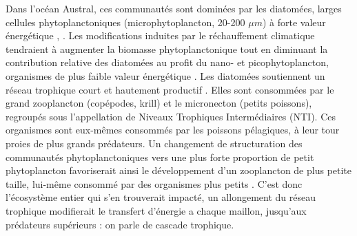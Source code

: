 \documentclass[11pt,a4paper,oneside]{report}
\begin{document}
	\vspace{0.3cm}
	
	Dans l'océan Austral, ces communautés sont dominées par les diatomées, larges cellules phytoplanctoniques (microphytoplancton, 20-200 $\mu m$) à forte valeur énergétique \cite{treguer1992}, \cite{heidemann2024drivers}. Les modifications induites par le réchauffement climatique tendraient à augmenter la biomasse phytoplanctonique \cite{delcastillo2019greener} \cite{adroli2026} tout en diminuant la contribution relative des diatomées au profit du nano- et picophytoplancton, organismes de plus faible valeur énergétique \cite{krumhardt2022climate}\cite{sari2025influence}. Les diatomées soutiennent un réseau trophique court et hautement productif \cite{treguer1992}. Elles sont consommées par le grand zooplancton (copépodes, krill) et le micronecton (petits poissons), regroupés sous l'appellation de Niveaux Trophiques Intermédiaires (NTI). Ces organismes sont eux-mêmes consommés par les poissons pélagiques, à leur tour proies de plus grands prédateurs. Un changement de structuration des communautés phytoplanctoniques vers une plus forte proportion de petit phytoplancton favoriserait ainsi le développement d'un zooplancton de plus petite taille, lui-même consommé par des organismes plus petits \cite{krumhardt2022climate}. C'est donc l'écosystème entier qui s'en trouverait impacté, un allongement du réseau trophique modifierait le transfert d'énergie a chaque maillon, jusqu'aux prédateurs supérieurs \cite{mestre2020decadal} : on parle de cascade trophique.
	
	
	\vspace{0.3cm}
	
\end{document}
